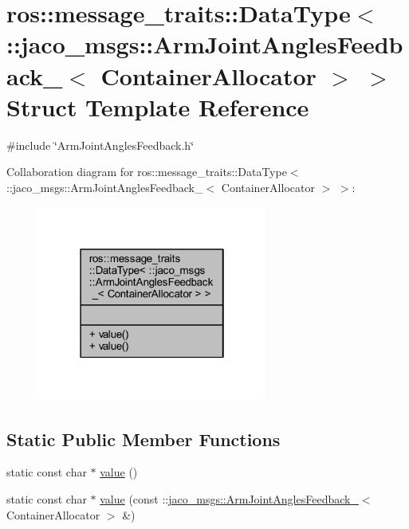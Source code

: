 \hypertarget{structros_1_1message__traits_1_1DataType_3_01_1_1jaco__msgs_1_1ArmJointAnglesFeedback___3_01ContainerAllocator_01_4_01_4}{}\section{ros\+:\+:message\+\_\+traits\+:\+:Data\+Type$<$ \+:\+:jaco\+\_\+msgs\+:\+:Arm\+Joint\+Angles\+Feedback\+\_\+$<$ Container\+Allocator $>$ $>$ Struct Template Reference}
\label{structros_1_1message__traits_1_1DataType_3_01_1_1jaco__msgs_1_1ArmJointAnglesFeedback___3_01ContainerAllocator_01_4_01_4}


{\ttfamily \#include \char`\"{}Arm\+Joint\+Angles\+Feedback.\+h\char`\"{}}



Collaboration diagram for ros\+:\+:message\+\_\+traits\+:\+:Data\+Type$<$ \+:\+:jaco\+\_\+msgs\+:\+:Arm\+Joint\+Angles\+Feedback\+\_\+$<$ Container\+Allocator $>$ $>$\+:
\nopagebreak
\begin{figure}[H]
\begin{center}
\leavevmode
\includegraphics[width=214pt]{d8/d14/structros_1_1message__traits_1_1DataType_3_01_1_1jaco__msgs_1_1ArmJointAnglesFeedback___3_01Contdc1aba6c21869aee9052f0a6c6f16ed8}
\end{center}
\end{figure}
\subsection*{Static Public Member Functions}
\begin{DoxyCompactItemize}
\item 
static const char $\ast$ \hyperlink{structros_1_1message__traits_1_1DataType_3_01_1_1jaco__msgs_1_1ArmJointAnglesFeedback___3_01ContainerAllocator_01_4_01_4_ad813dabb43108e60e17d3642c147a64a}{value} ()
\item 
static const char $\ast$ \hyperlink{structros_1_1message__traits_1_1DataType_3_01_1_1jaco__msgs_1_1ArmJointAnglesFeedback___3_01ContainerAllocator_01_4_01_4_ac05e8e4887b59dff775dfbe7d9269b17}{value} (const \+::\hyperlink{structjaco__msgs_1_1ArmJointAnglesFeedback__}{jaco\+\_\+msgs\+::\+Arm\+Joint\+Angles\+Feedback\+\_\+}$<$ Container\+Allocator $>$ \&)
\end{DoxyCompactItemize}


